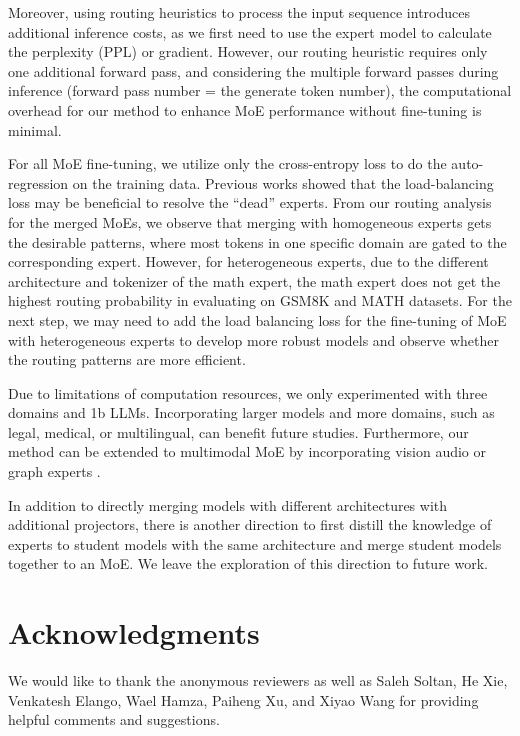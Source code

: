 Moreover, using routing heuristics to process the input sequence introduces additional inference costs, as we first need to use the expert model to calculate the perplexity (PPL) or gradient. However, our routing heuristic requires only one additional forward pass, and considering the multiple forward passes during inference (forward pass number = the generate token number), the computational overhead for our method to enhance MoE performance without fine-tuning is minimal.

For all MoE fine-tuning, we utilize only the cross-entropy loss to do the auto-regression on the training data. Previous works showed that the load-balancing loss \cite{fedus2022switch, sukhbaatar2024branchtrainmixmixingexpertllms} may be beneficial to resolve the ``dead'' experts. From our routing analysis for the merged MoEs, we observe that merging with homogeneous experts gets the desirable patterns, where most tokens in one specific domain are gated to the corresponding expert. However, for heterogeneous experts, due to the different architecture and tokenizer of the math expert, the math expert does not get the highest routing probability in evaluating on GSM8K and MATH datasets. For the next step, we may need to add the load balancing loss for the fine-tuning of MoE with heterogeneous experts to develop more robust models \cite{zhou2024explore} and observe whether the routing patterns are more efficient.

Due to limitations of computation resources, we only experimented with three domains and 1b LLMs. Incorporating larger models and more domains, such as legal, medical, or multilingual, can benefit future studies. Furthermore, our method can be extended to multimodal MoE by incorporating vision audio or graph experts \cite{wang2024mementos, wang2024enhancing, li2024uni, zhu2024multimodal}.

In addition to directly merging models with different architectures with additional projectors, there is another direction to first distill the knowledge of experts to student models with the same architecture \cite{wan2024knowledge, zhou2024teaching, li2025benchmarkevaluationsapplicationschallenges, zhou2023scalable, zhou2024multi} and merge student models together to an MoE. We leave the exploration of this direction to future work. 

\section*{Acknowledgments}
We would like to thank the anonymous reviewers as well
as Saleh Soltan, He Xie, Venkatesh Elango, Wael Hamza, Paiheng Xu, and Xiyao Wang for providing helpful comments and suggestions. 